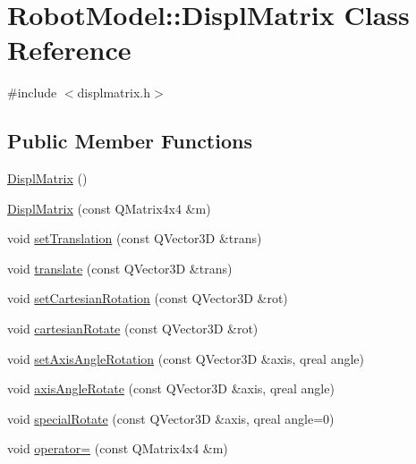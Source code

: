 \hypertarget{class_robot_model_1_1_displ_matrix}{
\section{RobotModel::DisplMatrix Class Reference}
\label{class_robot_model_1_1_displ_matrix}
}


{\ttfamily \#include $<$displmatrix.h$>$}\subsection*{Public Member Functions}
\begin{DoxyCompactItemize}
\item 
\hyperlink{class_robot_model_1_1_displ_matrix_a97463ac04605597575600274a23109de}{DisplMatrix} ()
\item 
\hyperlink{class_robot_model_1_1_displ_matrix_a6934f8d81e8e5b9c8dbcc1d6fd68c560}{DisplMatrix} (const QMatrix4x4 \&m)
\item 
void \hyperlink{class_robot_model_1_1_displ_matrix_a9ea9b65326be614baea1ea86a2a1b258}{setTranslation} (const QVector3D \&trans)
\item 
void \hyperlink{class_robot_model_1_1_displ_matrix_ae9aa3671b52f8300ac2f11648fa1fddf}{translate} (const QVector3D \&trans)
\item 
void \hyperlink{class_robot_model_1_1_displ_matrix_a8654f5029974e0154c3c46ec2bb3dbe3}{setCartesianRotation} (const QVector3D \&rot)
\item 
void \hyperlink{class_robot_model_1_1_displ_matrix_a337c49b52435255a7f36966c7047f6ff}{cartesianRotate} (const QVector3D \&rot)
\item 
void \hyperlink{class_robot_model_1_1_displ_matrix_ab976907c6be66c0aee20a24991ce4159}{setAxisAngleRotation} (const QVector3D \&axis, qreal angle)
\item 
void \hyperlink{class_robot_model_1_1_displ_matrix_aaf591b95247e1a80332ba0033427af7e}{axisAngleRotate} (const QVector3D \&axis, qreal angle)
\item 
void \hyperlink{class_robot_model_1_1_displ_matrix_ac77a7ddd42d4a58251823c1fe06d65a2}{specialRotate} (const QVector3D \&axis, qreal angle=0)
\item 
void \hyperlink{class_robot_model_1_1_displ_matrix_a3baf235c0c2c7eee46506dc2b2114fe2}{operator=} (const QMatrix4x4 \&m)
\end{DoxyCompactItemize}


